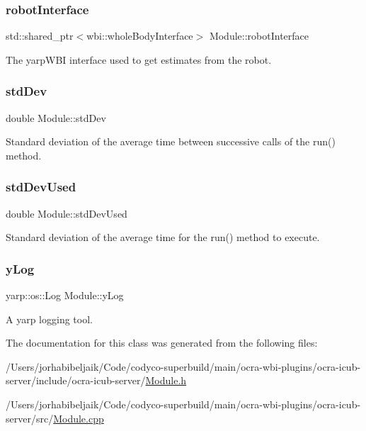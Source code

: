 \subsubsection{\texorpdfstring{robot\+Interface}{robotInterface}}
{\footnotesize\ttfamily std\+::shared\+\_\+ptr$<$wbi\+::whole\+Body\+Interface$>$ Module\+::robot\+Interface\hspace{0.3cm}{\ttfamily [private]}}

The yarp\+W\+BI interface used to get estimates from the robot. \hypertarget{classModule_af66a2dab82208cb2ea25da22fcaaa4a3}{}\label{classModule_af66a2dab82208cb2ea25da22fcaaa4a3} 
\subsubsection{\texorpdfstring{std\+Dev}{stdDev}}
{\footnotesize\ttfamily double Module\+::std\+Dev\hspace{0.3cm}{\ttfamily [private]}}

Standard deviation of the average time between successive calls of the {\ttfamily run()} method. \hypertarget{classModule_a57060f2788b6dc9906e66432e775e5ac}{}\label{classModule_a57060f2788b6dc9906e66432e775e5ac} 
\subsubsection{\texorpdfstring{std\+Dev\+Used}{stdDevUsed}}
{\footnotesize\ttfamily double Module\+::std\+Dev\+Used\hspace{0.3cm}{\ttfamily [private]}}

Standard deviation of the average time for the {\ttfamily run()} method to execute. \hypertarget{classModule_ae029b50069bf4ff53a6f69a5bae824f6}{}\label{classModule_ae029b50069bf4ff53a6f69a5bae824f6} 
\subsubsection{\texorpdfstring{y\+Log}{yLog}}
{\footnotesize\ttfamily yarp\+::os\+::\+Log Module\+::y\+Log\hspace{0.3cm}{\ttfamily [private]}}

A yarp logging tool. 

The documentation for this class was generated from the following files\+:\begin{DoxyCompactItemize}
\item 
/\+Users/jorhabibeljaik/\+Code/codyco-\/superbuild/main/ocra-\/wbi-\/plugins/ocra-\/icub-\/server/include/ocra-\/icub-\/server/\hyperlink{Module_8h}{Module.\+h}\item 
/\+Users/jorhabibeljaik/\+Code/codyco-\/superbuild/main/ocra-\/wbi-\/plugins/ocra-\/icub-\/server/src/\hyperlink{Module_8cpp}{Module.\+cpp}\end{DoxyCompactItemize}
